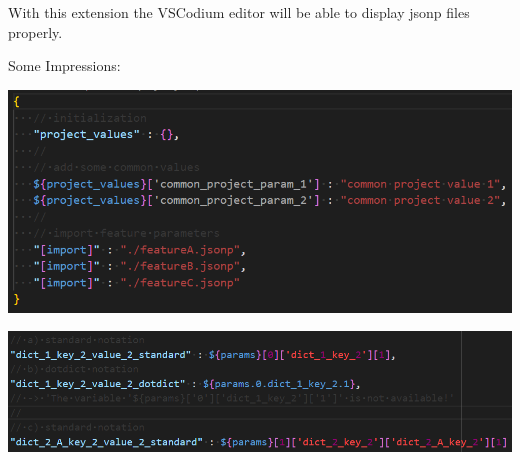 With this extension the VSCodium editor will be able to display jsonp files properly.

Some Impressions:

\includegraphics{./pictures/screenshot1.png}

\vspace{2ex}

\includegraphics{./pictures/screenshot2.png}







